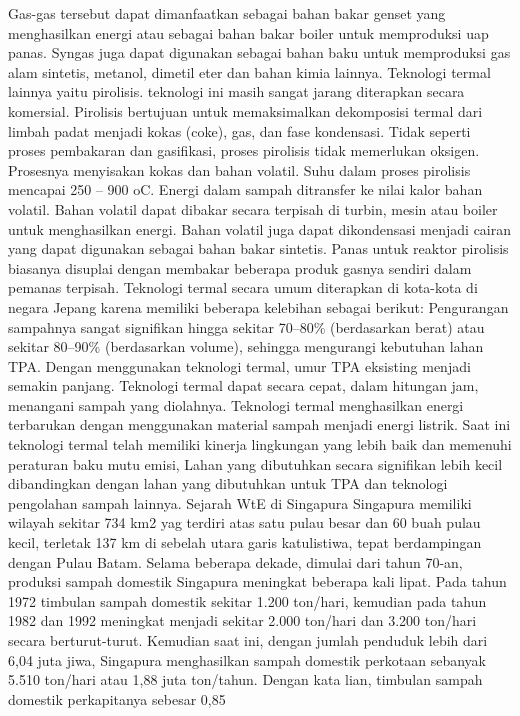 \documentclass[
  letterpaper,
  DIV=11,
  numbers=noendperiod]{scrreprt}
\begin{document}
Gas-gas tersebut dapat dimanfaatkan sebagai bahan bakar genset yang
menghasilkan energi atau sebagai bahan bakar boiler untuk memproduksi
uap panas. Syngas juga dapat digunakan sebagai bahan baku untuk
memproduksi gas alam sintetis, metanol, dimetil eter dan bahan kimia
lainnya. Teknologi termal lainnya yaitu pirolisis. teknologi ini masih
sangat jarang diterapkan secara komersial. Pirolisis bertujuan untuk
memaksimalkan dekomposisi termal dari limbah padat menjadi kokas (coke),
gas, dan fase kondensasi. Tidak seperti proses pembakaran dan
gasifikasi, proses pirolisis tidak memerlukan oksigen. Prosesnya
menyisakan kokas dan bahan volatil. Suhu dalam proses pirolisis mencapai
250 -- 900 oC. Energi dalam sampah ditransfer ke nilai kalor bahan
volatil. Bahan volatil dapat dibakar secara terpisah di turbin, mesin
atau boiler untuk menghasilkan energi. Bahan volatil juga dapat
dikondensasi menjadi cairan yang dapat digunakan sebagai bahan bakar
sintetis. Panas untuk reaktor pirolisis biasanya disuplai dengan
membakar beberapa produk gasnya sendiri dalam pemanas terpisah.
Teknologi termal secara umum diterapkan di kota-kota di negara Jepang
karena memiliki beberapa kelebihan sebagai berikut: Pengurangan
sampahnya sangat signifikan hingga sekitar 70--80\% (berdasarkan berat)
atau sekitar 80--90\% (berdasarkan volume), sehingga mengurangi
kebutuhan lahan TPA. Dengan menggunakan teknologi termal, umur TPA
eksisting menjadi semakin panjang. Teknologi termal dapat secara cepat,
dalam hitungan jam, menangani sampah yang diolahnya. Teknologi termal
menghasilkan energi terbarukan dengan menggunakan material sampah
menjadi energi listrik. Saat ini teknologi termal telah memiliki kinerja
lingkungan yang lebih baik dan memenuhi peraturan baku mutu emisi, Lahan
yang dibutuhkan secara signifikan lebih kecil dibandingkan dengan lahan
yang dibutuhkan untuk TPA dan teknologi pengolahan sampah lainnya.
Sejarah WtE di Singapura Singapura memiliki wilayah sekitar 734 km2 yag
terdiri atas satu pulau besar dan 60 buah pulau kecil, terletak 137 km
di sebelah utara garis katulistiwa, tepat berdampingan dengan Pulau
Batam. Selama beberapa dekade, dimulai dari tahun 70-an, produksi sampah
domestik Singapura meningkat beberapa kali lipat. Pada tahun 1972
timbulan sampah domestik sekitar 1.200 ton/hari, kemudian pada tahun
1982 dan 1992 meningkat menjadi sekitar 2.000 ton/hari dan 3.200
ton/hari secara berturut-turut. Kemudian saat ini, dengan jumlah
penduduk lebih dari 6,04 juta jiwa, Singapura menghasilkan sampah
domestik perkotaan sebanyak 5.510 ton/hari atau 1,88 juta ton/tahun.
Dengan kata lian, timbulan sampah domestik perkapitanya sebesar 0,85
\end{document}
